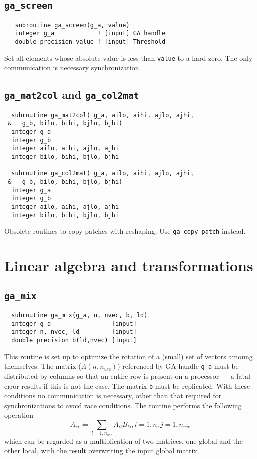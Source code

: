 \subsection{{\tt ga\_screen}}
\begin{verbatim}
   subroutine ga_screen(g_a, value)
   integer g_a            ! [input] GA handle
   double precision value ! [input] Threshold
\end{verbatim}
Set all elements whose absolute value is less than {\tt value} to a
hard zero.  The only communication is necessary synchronization.

\subsection{{\tt ga\_mat2col} and {\tt ga\_col2mat}}
\begin{verbatim}
  subroutine ga_mat2col( g_a, ailo, aihi, ajlo, ajhi,
 &   g_b, bilo, bihi, bjlo, bjhi)
  integer g_a
  integer g_b
  integer ailo, aihi, ajlo, ajhi
  integer bilo, bihi, bjlo, bjhi

  subroutine ga_col2mat( g_a, ailo, aihi, ajlo, ajhi,
 &   g_b, bilo, bihi, bjlo, bjhi)
  integer g_a
  integer g_b
  integer ailo, aihi, ajlo, ajhi
  integer bilo, bihi, bjlo, bjhi
\end{verbatim}
Obsolete routines to copy patches with reshaping. Use \verb+ga_copy_patch+
instead.

\section{Linear algebra and transformations}

\subsection{{\tt ga\_mix}}
\begin{verbatim}
  subroutine ga_mix(g_a, n, nvec, b, ld)
  integer g_a                 [input]
  integer n, nvec, ld         [input]
  double precision b(ld,nvec) [input]
\end{verbatim}
This routine is set up to optimize the rotation of a (small) set of
vectors amoung themselves.  The matrix ($A(n,n_{vec})$) referenced by
GA handle \verb+g_a+ must be distributed by columns so that an entire
row is present on a processor --- a fatal error results if this is not
the case.  The matrix {\tt b} must be replicated.  With these
conditions no communication is necessary, other than that required for
synchronizations to avoid race conditions.  The routine performs the
following operation
\begin{displaymath}
     A_{ij} \Leftarrow \sum_{l=1,n_{vec}} A_{il} B_{lj}, i=1,n; j=1,n_{vec}
\end{displaymath}
which can be regarded as a multiplication of two matrices, one global
and the other local, with the result overwriting the input global
matrix.

